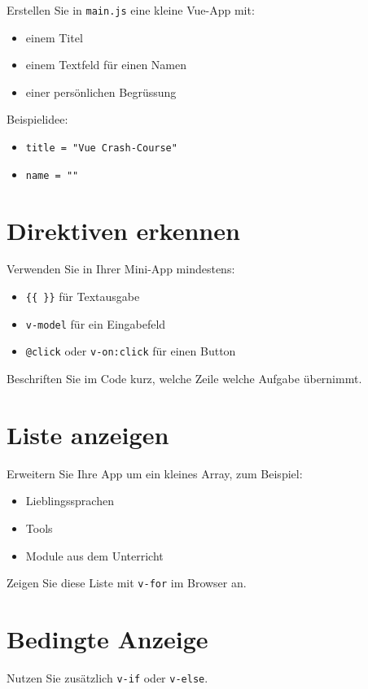 \documentclass[a4paper,12pt]{article}
\begin{document}
Erstellen Sie in \texttt{main.js} eine kleine Vue-App mit:
\begin{itemize}
    \item einem Titel
    \item einem Textfeld für einen Namen
    \item einer persönlichen Begrüssung
\end{itemize}

Beispielidee:
\begin{itemize}
    \item \texttt{title = "Vue Crash-Course"}
    \item \texttt{name = ""}
\end{itemize}

\section{Direktiven erkennen}

Verwenden Sie in Ihrer Mini-App mindestens:
\begin{itemize}
    \item \texttt{\{\{ \}\}} für Textausgabe
    \item \texttt{v-model} für ein Eingabefeld
    \item \texttt{@click} oder \texttt{v-on:click} für einen Button
\end{itemize}

Beschriften Sie im Code kurz, welche Zeile welche Aufgabe übernimmt.

\section{Liste anzeigen}

Erweitern Sie Ihre App um ein kleines Array, zum Beispiel:
\begin{itemize}
    \item Lieblingssprachen
    \item Tools
    \item Module aus dem Unterricht
\end{itemize}

Zeigen Sie diese Liste mit \texttt{v-for} im Browser an.

\section{Bedingte Anzeige}

Nutzen Sie zusätzlich \texttt{v-if} oder \texttt{v-else}.
\end{document}
